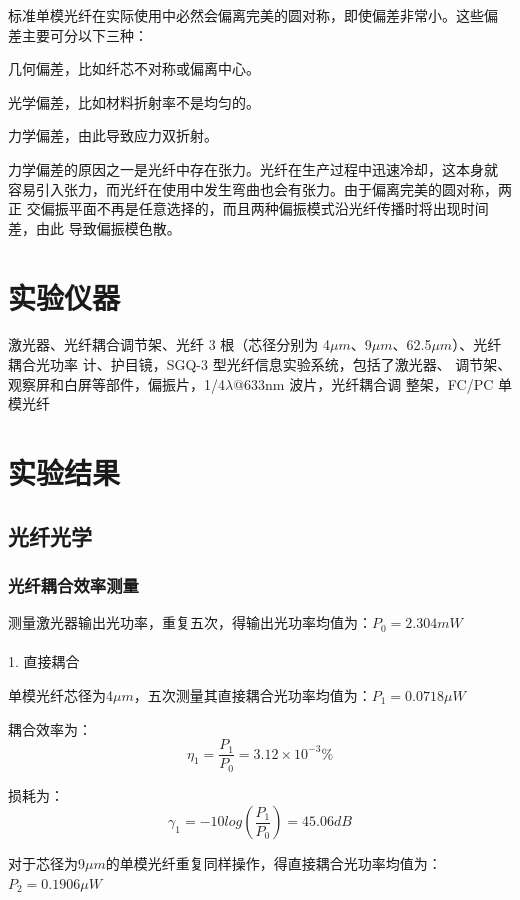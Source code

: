 \documentclass[10pt,a4paper,twoside,UTF8]{ctexart}
\begin{document}
标准单模光纤在实际使用中必然会偏离完美的圆对称，即使偏差非常小。这些偏
差主要可分以下三种：

几何偏差，比如纤芯不对称或偏离中心。

光学偏差，比如材料折射率不是均匀的。

力学偏差，由此导致应力双折射。

力学偏差的原因之一是光纤中存在张力。光纤在生产过程中迅速冷却，这本身就
容易引入张力，而光纤在使用中发生弯曲也会有张力。由于偏离完美的圆对称，两正
交偏振平面不再是任意选择的，而且两种偏振模式沿光纤传播时将出现时间差，由此
导致偏振模色散。

\section{实验仪器}
激光器、光纤耦合调节架、光纤 3 根（芯径分别为 4$\mu m$、9$\mu m$、62.5$\mu m$）、光纤耦合光功率
计、护目镜，SGQ-3 型光纤信息实验系统，包括了激光器、
调节架、观察屏和白屏等部件，偏振片，1/4$\lambda$@633nm 波片，光纤耦合调
整架，FC/PC 单模光纤

\section{实验结果}
\subsection{光纤光学}
\subsubsection{光纤耦合效率测量}
测量激光器输出光功率，重复五次，得输出光功率均值为：$P_0=2.304mW$
\\ \hspace*{\fill} \\

1. 直接耦合

单模光纤芯径为4$\mu m$，五次测量其直接耦合光功率均值为：$P_1=0.0718\mu W$

耦合效率为：
\begin{equation*}
	\eta_1=\frac{P_1}{P_0}=3.12\times10^{-3}\%
\end{equation*}

损耗为：
\begin{equation*}
	\gamma_1=-10log\left(\frac{P_1}{P_0}\right)=45.06dB
\end{equation*}

对于芯径为9$\mu m$的单模光纤重复同样操作，得直接耦合光功率均值为：$P_2=0.1906\mu W$
\end{document}
